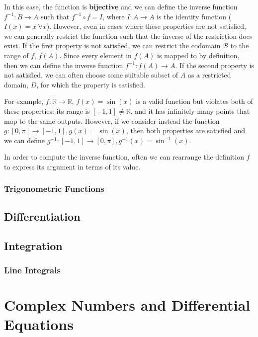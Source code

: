 \documentclass[11pt,titlepage]{article}
\numberwithin{equation}{section}
\begin{document}
In this case, the function is \textbf{bijective} and we can define the inverse function $f^{-1}:B\to A$ such that $f^{-1}\circ f = I$, where $I:A\to A$ is the identity function ($I(x) = x\ \forall x$). However, even in cases where these properties are not satisfied, we can generally restrict the function such that the inverse of the restriction does exist. If the first property is not satisfied, we can restrict the codomain $\mathcal{B}$ to the range of $f$, $f(A)$. Since every element in $f(A)$ is mapped to by definition, then we can define the inverse function $f^{-1}:f(A)\to A$. If the second property is not satisfied, we can often choose some suitable subset of $A$ as a restricted domain, $D$, for which the property is satisfied.

For example, $f:\mathbb{R}\rightarrow\mathbb{R}$, $f(x) = \sin(x)$ is a valid function but violates both of these properties: its range is $[-1,1] \neq \mathbb{R}$, and it has infinitely many points that map to the same outputs. However, if we consider instead the function $g:[0,\pi]\rightarrow[-1,1], g(x) = \sin(x)$, then both properties are satisfied and we can define $g^{-1}:[-1,1]\rightarrow[0,\pi], g^{-1}(x) = \sin^{-1}(x)$.

In order to compute the inverse function, often we can rearrange the definition $f$ to express its argument in terms of its value.

\subsubsection{Trigonometric Functions}



\subsection{Differentiation}
\subsection{Integration}

\subsubsection{Line Integrals}
\label{subsec:lineintergral}


\section{Complex Numbers and Differential Equations}
\end{document}
